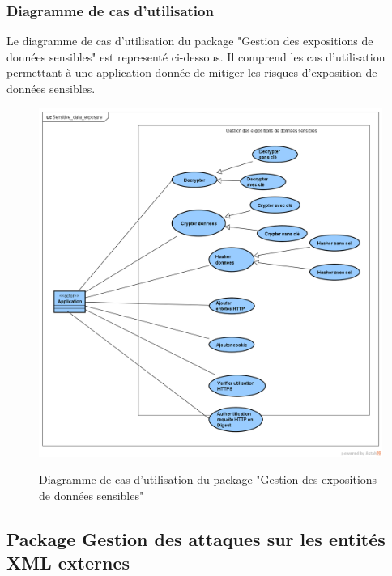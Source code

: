 \subsubsection{Diagramme de cas d'utilisation}
Le diagramme de cas d'utilisation du package "Gestion des expositions de données sensibles" est representé ci-dessous. Il comprend les cas d'utilisation permettant à une application donnée de mitiger les risques d'exposition de données sensibles.\\ 
\begin{figure}[H]
	\centering
	\begin{minipage}{12cm}
		\centering
		{\includegraphics[height=0.30\textheight]{fig/Gestion-exposition-donnees-use-case-diagram.png}}
	\end{minipage}
	\caption{Diagramme de cas d'utilisation du package "Gestion des expositions de données sensibles"}
	\label{fig:7.4}
\end{figure}

\subsection{Package Gestion des attaques sur les entités XML externes}
